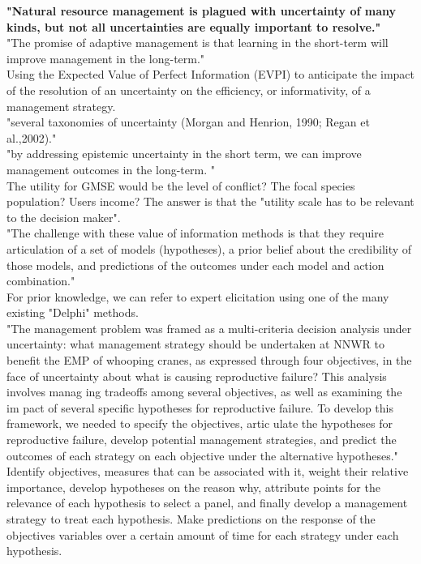 \documentclass[12pt]{article}
\begin{document}
\textbf{"Natural resource management is plagued with uncertainty of many kinds, but not all uncertainties are equally important to resolve."}\\
"The promise of adaptive management is that learning in the short-term will
improve management in the long-term."\\
Using the Expected Value of Perfect Information (EVPI) to anticipate the impact of the resolution of an uncertainty on the efficiency, or informativity, of a management strategy.\\
"several taxonomies of uncertainty (Morgan and Henrion, 1990; Regan et al.,2002)."\\
"by addressing epistemic uncertainty in the short term, we can improve management outcomes in the long-term. "\\
The utility for GMSE would be the level of conflict? The focal species population? Users income? The answer is that the "utility scale has to be relevant to the decision maker".\\
"The challenge with these value of information methods is that
they require articulation of a set of models (hypotheses), a prior
belief about the credibility of those models, and predictions of
the outcomes under each model and action combination."\\
For prior knowledge, we can refer to expert elicitation using one of the many existing "Delphi" methods.\\

"The management problem was framed as a multi-criteria decision analysis under uncertainty: what management strategy should
be undertaken at NNWR to benefit the EMP of whooping cranes, as
expressed through four objectives, in the face of uncertainty about
what is causing reproductive failure? This analysis involves manag
ing tradeoffs among several objectives, as well as examining the im
pact of several specific hypotheses for reproductive failure. To
develop this framework, we needed to specify the objectives, artic
ulate the hypotheses for reproductive failure, develop potential
management strategies, and predict the outcomes of each strategy
on each objective under the alternative hypotheses."
Identify objectives, measures that can be associated with it, weight their relative importance, develop hypotheses on the reason why, attribute points for the relevance of each hypothesis to select a panel, and finally develop a management strategy to treat each hypothesis. Make predictions on the response of the objectives variables over a certain amount of time for each strategy under each hypothesis.\\
\end{document}
